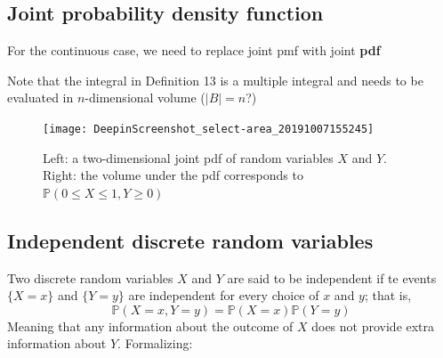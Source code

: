 \documentclass{report}
\theoremstyle{definition}
\newtheorem{definition}{Definition}
\theoremstyle{plain}
\theoremstyle{remark}
\begin{document}
\subsection{Joint probability density function}
For the continuous case, we need to replace joint pmf with joint \textbf{pdf}
\begin{center}
\end{center}
Note that the integral in Definition 13 is a multiple integral and needs to be
evaluated in $ n $-dimensional volume ($|B| = n $?)

\begin{figure}[h]
  \centering
  \texttt{[image: DeepinScreenshot\_select-area\_20191007155245]}
  \caption{Left: a two-dimensional joint pdf of random variables $ X $ and
  $ Y $. Right: the volume under the pdf corresponds to $ \mathbb{P} (0 \leq
X \leq 1, Y \geq 0) $}%
  \label{}
\end{figure}
\subsection{Independent discrete random variables}
Two discrete random variables $ X $ and $ Y $ are said to be independent if te
events $ \{X = x\} $ and $ \{Y = y\} $ are independent for every choice of
$ x $ and $ y $; that is,
$$ \mathbb{P} (X = x, Y = y) = \mathbb{P} (X = x) \mathbb{P} (Y=y) $$
Meaning that any information about the outcome of $ X $ does not provide extra
information about $ Y $. Formalizing:
\begin{center}
\end{center}
\end{document}
